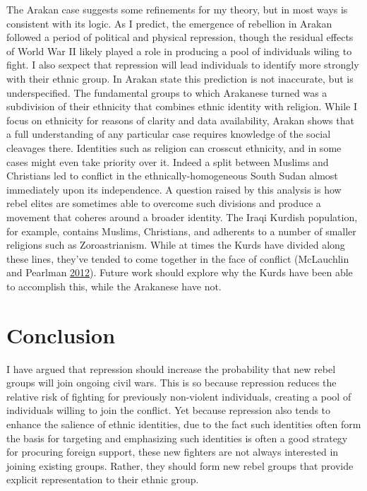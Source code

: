 \documentclass[12pt,]{book}
\theoremstyle{definition}
\theoremstyle{definition}
\theoremstyle{remark}
\begin{document}
The Arakan case suggests some refinements for my theory, but in most
ways is consistent with its logic. As I predict, the emergence of
rebellion in Arakan followed a period of political and physical
repression, though the residual effects of World War II likely played a
role in producing a pool of individuals wiling to fight. I also sexpect
that repression will lead individuals to identify more strongly with
their ethnic group. In Arakan state this prediction is not inaccurate,
but is underspecified. The fundamental groups to which Arakanese turned
was a subdivision of their ethnicity that combines ethnic identity with
religion. While I focus on ethnicity for reasons of clarity and data
availability, Arakan shows that a full understanding of any particular
case requires knowledge of the social cleavages there. Identities such
as religion can crosscut ethnicity, and in some cases might even take
priority over it. Indeed a split between Muslims and Christians led to
conflict in the ethnically-homogeneous South Sudan almost immediately
upon its independence. A question raised by this analysis is how rebel
elites are sometimes able to overcome such divisions and produce a
movement that coheres around a broader identity. The Iraqi Kurdish
population, for example, contains Muslims, Christians, and adherents to
a number of smaller religions such as Zoroastrianism. While at times the
Kurds have divided along these lines, they've tended to come together in
the face of conflict (McLauchlin and Pearlman
\protect\hyperlink{ref-McLauchlin2012}{2012}). Future work should
explore why the Kurds have been able to accomplish this, while the
Arakanese have not.

\section{Conclusion}\label{conclusion}

I have argued that repression should increase the probability that new
rebel groups will join ongoing civil wars. This is so because repression
reduces the relative risk of fighting for previously non-violent
individuals, creating a pool of individuals willing to join the
conflict. Yet because repression also tends to enhance the salience of
ethnic identities, due to the fact such identities often form the basis
for targeting and emphasizing such identities is often a good strategy
for procuring foreign support, these new fighters are not always
interested in joining existing groups. Rather, they should form new
rebel groups that provide explicit representation to their ethnic group.
\end{document}
